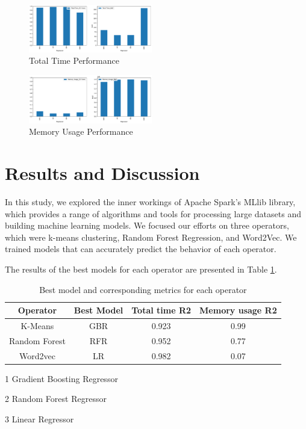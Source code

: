 \documentclass[conference]{IEEEtran}
\begin{document}
\begin{figure}[!h]
  \centering
  \includegraphics[width=0.48\textwidth]{plots/model_performance_results/Word2Vec_total_time_results.pdf}
  \caption{Total Time Performance}
\end{figure}

\begin{figure}[!h]
  \centering
  \includegraphics[width=0.48\textwidth]{plots/model_performance_results/Word2Vec_memory_results.pdf}
  \caption{Memory Usage Performance}
\end{figure}



\section{Results and Discussion}

In this study, we explored the inner workings of Apache Spark's MLlib library, which provides a range of algorithms and tools for processing large datasets and building machine learning models. We focused our efforts on three operators, which were k-means clustering, Random Forest Regression, and Word2Vec. We trained models that can accurately predict the behavior of each operator. 

The results of the best models for each operator are presented in Table \ref{tab:ml-operators}.

\begin{table}[ht]
\centering
\caption{Best model and corresponding metrics for each operator}
\label{tab:ml-operators}
\begin{threeparttable}

\begin{tabular}{|c|c|c|c|}
\hline
Operator & Best Model & Total time R2 & Memory usage R2 \\ \hline
K-Means & GBR\tnote{1} & 0.923 & 0.99 \\ \hline
Random Forest & RFR\tnote{2} & 0.952 & 0.77 \\ \hline
Word2vec & LR\tnote{3} & 0.982 & 0.07 \\ \hline
\end{tabular}
\begin{tablenotes}
    \item[1] Gradient Boosting Regressor
    \item[2] Random Forest Regressor
    \item[3] Linear Regressor
  \end{tablenotes}

\end{threeparttable}
\end{table}
\end{document}
